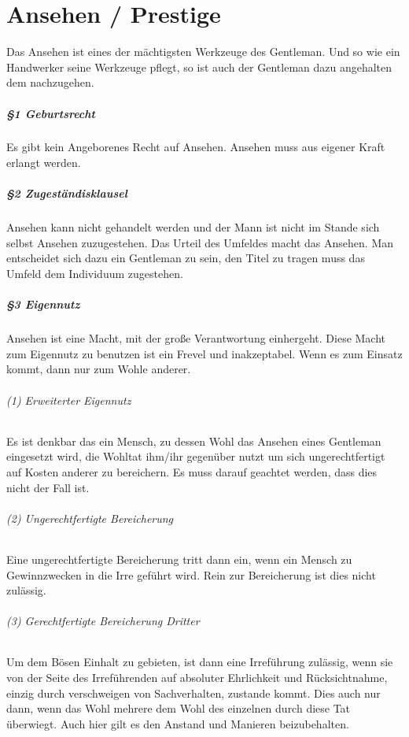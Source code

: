 \chapter{Ansehen / Prestige}
Das Ansehen ist eines der mächtigsten Werkzeuge des Gentleman. Und so wie ein Handwerker seine Werkzeuge pflegt, so ist auch der Gentleman dazu angehalten dem nachzugehen. 

\paragraph{§1 Geburtsrecht}
Es gibt kein Angeborenes Recht auf Ansehen. Ansehen muss aus eigener Kraft erlangt werden.

\paragraph{§2 Zugeständisklausel}
Ansehen kann nicht gehandelt werden und der Mann ist nicht im Stande sich selbst Ansehen zuzugestehen. Das Urteil des Umfeldes macht das Ansehen. Man entscheidet sich dazu ein Gentleman zu sein, den Titel zu tragen muss das Umfeld dem Individuum zugestehen.

\paragraph{§3 Eigennutz}
Ansehen ist eine Macht, mit der große Verantwortung einhergeht. Diese Macht zum Eigennutz zu benutzen ist ein Frevel und inakzeptabel. Wenn es zum Einsatz kommt, dann nur zum Wohle anderer.

\subparagraph{(1) Erweiterter Eigennutz}
Es ist denkbar das ein Mensch, zu dessen Wohl das Ansehen eines Gentleman eingesetzt wird, die Wohltat ihm/ihr gegenüber nutzt um sich ungerechtfertigt auf Kosten anderer zu bereichern. Es muss darauf geachtet werden, dass dies nicht der Fall ist.

\subparagraph{(2) Ungerechtfertigte Bereicherung} Eine ungerechtfertigte Bereicherung tritt dann ein, wenn ein Mensch zu Gewinnzwecken in die Irre geführt wird. Rein zur Bereicherung ist dies nicht zulässig.

\subparagraph{(3) Gerechtfertigte Bereicherung Dritter} Um dem Bösen Einhalt zu gebieten, ist dann eine Irreführung zulässig, wenn sie von der Seite des Irreführenden auf absoluter Ehrlichkeit und Rücksichtnahme, einzig durch verschweigen von Sachverhalten, zustande kommt. Dies auch nur dann, wenn das Wohl mehrere dem Wohl des einzelnen durch diese Tat überwiegt. Auch hier gilt es den Anstand und Manieren beizubehalten.

